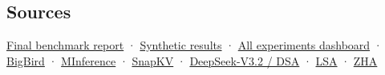 \documentclass[
  10pt,
]{article}
\begin{document}
\subsection{Sources}\label{sources}

\href{../modal_rd/results/final_bigger_bird_20261101/results-report.md}{Final
benchmark report} · \href{../modal_rd/RESULTS.md}{Synthetic results} ·
\href{../dashboard.html}{All experiments dashboard} ·
\href{https://arxiv.org/abs/2007.14062}{BigBird} ·
\href{https://arxiv.org/abs/2407.02490}{MInference} ·
\href{https://arxiv.org/abs/2404.14469}{SnapKV} ·
\href{https://arxiv.org/abs/2512.02556}{DeepSeek-V3.2 / DSA} ·
\href{https://arxiv.org/abs/2610.42147}{LSA} ·
\href{https://arxiv.org/abs/2610.42112}{ZHA}
\end{document}
